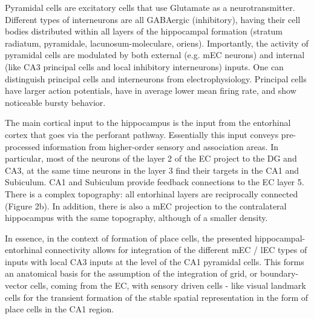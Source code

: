Pyramidal cells are excitatory cells that use Glutamate as a neurotransmitter. Different types of interneurons are all GABAergic (inhibitory), having their cell bodies distributed within all layers of the hippocampal formation (stratum radiatum, pyramidale, lacunosum-moleculare, oriens). Importantly, the activity of pyramidal cells are modulated by both external (e.g. mEC neurons) and internal (like CA3 principal cells and local inhibitory interneurons) inputs. One can distinguish principal cells and interneurons from electrophysiology. Principal cells have larger action potentials, have in average lower mean firing rate, and show noticeable bursty behavior.

The main cortical input to the hippocampus is the input from the entorhinal cortex that goes via the perforant pathway. Essentially this input conveys pre-processed information from higher-order sensory and association areas. In particular, most of the neurons of the layer 2 of the EC project to the DG and CA3, at the same time neurons in the layer 3 find their targets in the CA1 and Subiculum. CA1 and Subiculum provide feedback connections to the EC layer 5. There is a complex topography: all entorhinal layers are reciprocally connected (Figure 2b). In addition, there is also a mEC projection to the contralateral hippocampus with the same topography, although of a smaller density.

In essence, in the context of formation of place cells, the presented hippocampal-entorhinal connectivity allows for integration of the different mEC / lEC types of inputs with local CA3 inputs at the level of the CA1 pyramidal cells. This forms an anatomical basis for the assumption of the integration of grid, or boundary-vector cells, coming from the EC, with sensory driven cells - like visual landmark cells for the transient formation of the stable spatial representation in the form of place cells in the CA1 region.

